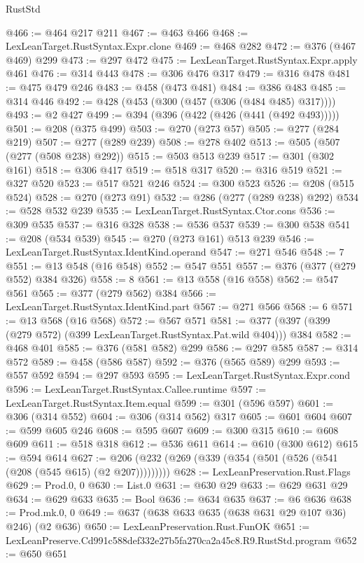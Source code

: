 \begin{lexlean}{RustStd}
\begin{coremodule}
@466 := @464 @217 @211
@467 := @463 @466
@468 := LexLeanTarget.RustSyntax.Expr.clone
@469 := @468 @282
@472 := @376 (@467 @469) @299
@473 := @297 @472
@475 := LexLeanTarget.RustSyntax.Expr.apply @461
@476 := @314 @443
@478 := @306 @476 @317
@479 := @316 @478
@481 := @475 @479 @246
@483 := @458 (@473 @481)
@484 := @386 @483
@485 := @314 @446
@492 := @428 (@453 (@300 (@457 (@306 (@484 @485) @317))))
@493 := @2 @427
@499 := @394 (@396 (@422 (@426 (@441 (@492 @493)))))
@501 := @208 (@375 @499)
@503 := @270 (@273 @57)
@505 := @277 (@284 @219)
@507 := @277 (@289 @239)
@508 := @278 @402
@513 := @505 (@507 (@277 (@508 @238) @292))
@515 := @503 @513 @239
@517 := @301 (@302 @161)
@518 := @306 @417
@519 := @518 @317
@520 := @316 @519
@521 := @327 @520
@523 := @517 @521 @246
@524 := @300 @523
@526 := @208 (@515 @524)
@528 := @270 (@273 @91)
@532 := @286 (@277 (@289 @238) @292)
@534 := @528 @532 @239
@535 := LexLeanTarget.RustSyntax.Ctor.cons
@536 := @309 @535
@537 := @316 @328
@538 := @536 @537
@539 := @300 @538
@541 := @208 (@534 @539)
@545 := @270 (@273 @161) @513 @239
@546 := LexLeanTarget.RustSyntax.IdentKind.operand
@547 := @271 @546
@548 := 7
@551 := @13 @548 (@16 @548)
@552 := @547 @551
@557 := @376 (@377 (@279 @552) @384 @326)
@558 := 8
@561 := @13 @558 (@16 @558)
@562 := @547 @561
@565 := @377 (@279 @562) @384
@566 := LexLeanTarget.RustSyntax.IdentKind.part
@567 := @271 @566
@568 := 6
@571 := @13 @568 (@16 @568)
@572 := @567 @571
@581 := @377 (@397 (@399 (@279 @572) (@399 LexLeanTarget.RustSyntax.Pat.wild @404))) @384
@582 := @468 @401
@585 := @376 (@581 @582) @299
@586 := @297 @585
@587 := @314 @572
@589 := @458 (@586 @587)
@592 := @376 (@565 @589) @299
@593 := @557 @592
@594 := @297 @593
@595 := LexLeanTarget.RustSyntax.Expr.cond
@596 := LexLeanTarget.RustSyntax.Callee.runtime
@597 := LexLeanTarget.RustSyntax.Item.equal
@599 := @301 (@596 @597)
@601 := @306 (@314 @552)
@604 := @306 (@314 @562) @317
@605 := @601 @604
@607 := @599 @605 @246
@608 := @595 @607
@609 := @300 @315
@610 := @608 @609
@611 := @518 @318
@612 := @536 @611
@614 := @610 (@300 @612)
@615 := @594 @614
@627 := @206 (@232 (@269 (@339 (@354 (@501 (@526 (@541 (@208 (@545 @615) (@2 @207)))))))))
@628 := LexLeanPreservation.Rust.Flags
@629 := Prod.{0, 0}
@630 := List.{0}
@631 := @630 @29
@633 := @629 @631 @29
@634 := @629 @633
@635 := Bool
@636 := @634 @635
@637 := @6 @636
@638 := Prod.mk.{0, 0}
@649 := @637 (@638 @633 @635 (@638 @631 @29 @107 @36) @246) (@2 @636)
@650 := LexLeanPreservation.Rust.FunOK
@651 := LexLeanPreserve.Cd991c588def332e27b5fa270ca2a45c8.R9.RustStd.program
@652 := @650 @651

\end{coremodule}
\end{lexlean}
